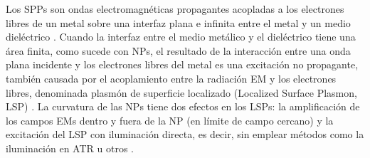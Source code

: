 		
Los SPPs son ondas electromagnéticas propagantes acopladas a los electrones libres de un metal sobre una interfaz plana e infinita entre el metal y un medio dieléctrico \cite{maier2007plasmonics}. Cuando la interfaz  entre el medio metálico y el dieléctrico tiene una área finita, como sucede con NPs, el resultado de la interacción entre una onda plana incidente y los electrones libres del metal es una excitación no propagante, también causada por el acoplamiento entre la radiación EM y los electrones libres, denominada plasmón de superficie localizado (Localized Surface Plasmon, LSP) \cite{maier2007plasmonics}. La curvatura de las NPs tiene dos efectos en los LSPs: la amplificación de los campos EMs dentro y fuera de la NP (en límite de campo cercano) y la excitación del LSP con iluminación directa, es decir, 
sin emplear métodos como la iluminación en ATR u otros \cite{maier2007plasmonics}.

